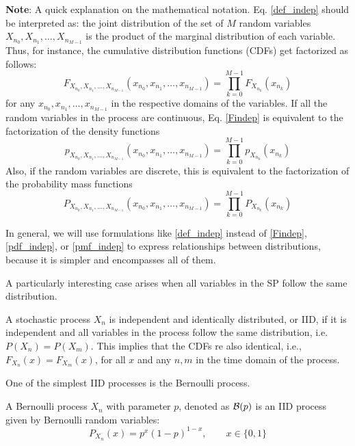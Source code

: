 \textbf{Note}: A quick explanation on the mathematical notation. Eq. \eqref{def_indep} should be interpreted as: the joint distribution of the set of $M$ random variables $X_{n_0}, X_{n_1}, \ldots, X_{n_{M-1}}$ is the product of the marginal distribution of each variable. Thus, for instance, the cumulative distribution functions (CDFs) get factorized as follows:
\begin{equation}
\label{Findep}
F_{X_{n_0}, X_{n_1}, \ldots, X_{n_{M-1}}}(x_{n_0}, x_{n_1}, \ldots, x_{n_{M-1}}) = \prod_{k=0}^{M-1} F_{X_{n_k}}(x_{n_k})
\end{equation}
for any $x_{n_0}, x_{n_1}, \ldots, x_{n_{M-1}}$ in the respective domains of the variables. If all the random variables in the process are continuous, Eq. \eqref{Findep} is equivalent to the factorization of the density functions
\begin{equation}
\label{pdf_indep}
p_{X_{n_0}, X_{n_1}, \ldots, X_{n_{M-1}}}(x_{n_0}, x_{n_1}, \ldots, x_{n_{M-1}}) = \prod_{k=0}^{M-1} p_{X_{n_k}}(x_{n_k})
\end{equation}
Also, if the random variables are discrete, this is equivalent to the factorization of the probability mass functions
\begin{equation}
\label{pmf_indep}
P_{X_{n_0}, X_{n_1}, \ldots, X_{n_{M-1}}}(x_{n_0}, x_{n_1}, \ldots, x_{n_{M-1}}) = \prod_{k=0}^{M-1} P_{X_{n_k}}(x_{n_k})
\end{equation}

In general, we will use formulations like \eqref{def_indep} instead of \eqref{Findep}, \eqref{pdf_indep}, or \eqref{pmf_indep} to express relationships between distributions, because it is simpler and encompasses all of them.

A particularly interesting case arises when all variables in the SP follow the same distribution.

\begin{definition}

A stochastic process $X_n$ is independent and identically distributed, or IID, if it is independent and all variables in the process follow the same distribution, i.e. $P(X_n)=P(X_m)$. This implies that the CDFs re also identical, i.e., $F_{X_n}(x)= F_{X_m}(x)$, for all $x$ and any $n, m$ in the time domain of the process.
\end{definition}

One of the simplest IID processes is the Bernoulli process.

\begin{example}
A Bernoulli process $X_n$ with parameter $p$, denoted as ${\cal B}(p)$ is an IID process given by Bernoulli random variables:
\begin{equation}
\label{SP:Bernoulli}
P_{X_n}(x) = p^x (1-p)^{1-x},  \qquad x \in \{0, 1\}
\end{equation}
\end{example}

